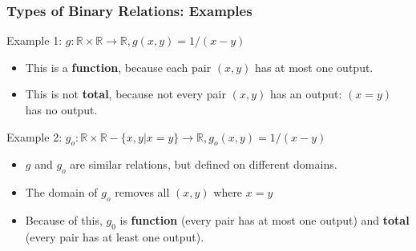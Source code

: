 \begin{frame}
  \frametitle{Types of Binary Relations: Examples}

    \begin{block}{Example 1: $g: \mathbb{R}\times\mathbb{R} \rightarrow \mathbb{R}, g(x,y) = 1/(x-y)$}
      \begin{itemize}
      \item This is a {\bf function}, because each pair $(x,y)$ has at most one output.
      \item This is not {\bf total}, because not every pair $(x,y)$ has an output: $(x = y)$ has no output.
      \end{itemize}
    \end{block}

    \begin{block}{Example 2: $g_o: \mathbb{R}\times\mathbb{R} - \{x,y|x=y\} \rightarrow \mathbb{R}, g_o(x,y) = 1/(x-y)$}
      \begin{itemize}
      \item $g$ and $g_o$ are similar relations, but defined on different domains.
      \item The domain of $g_o$ removes all $(x,y)$ where $x = y$
      \item Because of this, $g_0$ is {\bf function} (every pair has at most one output) and {\bf total} (every pair has at least one output).
      \end{itemize}

    \end{block}

\end{frame}

%
%
%
%
%
%
%
%
